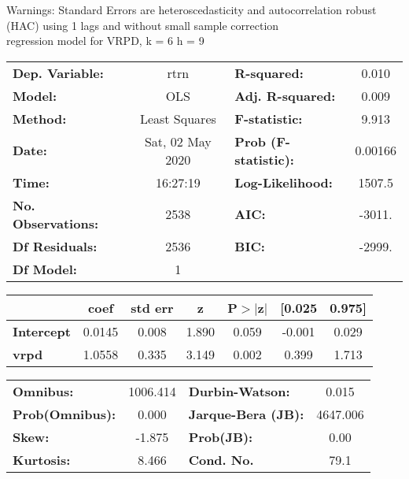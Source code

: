 Warnings: \newline
 [1] Standard Errors are heteroscedasticity and autocorrelation robust (HAC) using 1 lags and without small sample correction\\ 

regression model for VRPD, k = 6 h = 9\begin{center}
\begin{tabular}{lclc}
\toprule
\textbf{Dep. Variable:}    &       rtrn       & \textbf{  R-squared:         } &     0.010   \\
\textbf{Model:}            &       OLS        & \textbf{  Adj. R-squared:    } &     0.009   \\
\textbf{Method:}           &  Least Squares   & \textbf{  F-statistic:       } &     9.913   \\
\textbf{Date:}             & Sat, 02 May 2020 & \textbf{  Prob (F-statistic):} &  0.00166    \\
\textbf{Time:}             &     16:27:19     & \textbf{  Log-Likelihood:    } &    1507.5   \\
\textbf{No. Observations:} &        2538      & \textbf{  AIC:               } &    -3011.   \\
\textbf{Df Residuals:}     &        2536      & \textbf{  BIC:               } &    -2999.   \\
\textbf{Df Model:}         &           1      & \textbf{                     } &             \\
\bottomrule
\end{tabular}
\begin{tabular}{lcccccc}
                   & \textbf{coef} & \textbf{std err} & \textbf{z} & \textbf{P$> |$z$|$} & \textbf{[0.025} & \textbf{0.975]}  \\
\midrule
\textbf{Intercept} &       0.0145  &        0.008     &     1.890  &         0.059        &       -0.001    &        0.029     \\
\textbf{vrpd}      &       1.0558  &        0.335     &     3.149  &         0.002        &        0.399    &        1.713     \\
\bottomrule
\end{tabular}
\begin{tabular}{lclc}
\textbf{Omnibus:}       & 1006.414 & \textbf{  Durbin-Watson:     } &    0.015  \\
\textbf{Prob(Omnibus):} &   0.000  & \textbf{  Jarque-Bera (JB):  } & 4647.006  \\
\textbf{Skew:}          &  -1.875  & \textbf{  Prob(JB):          } &     0.00  \\
\textbf{Kurtosis:}      &   8.466  & \textbf{  Cond. No.          } &     79.1  \\
\bottomrule
\end{tabular}
\end{center}

